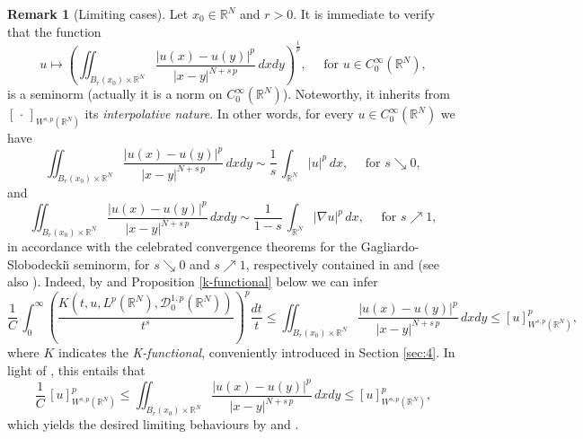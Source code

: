 \documentclass{amsart}
\theoremstyle{definition}
\newtheorem{remark}[theorem]{Remark}
\numberwithin{equation}{section}
\begin{document}
	\begin{remark} [Limiting cases] \label{rmk:seminorma-asimmetrica}
		Let $x_0 \in \mathbb{R}^N$ and $r > 0$. It is immediate to verify that the function 
		\begin{equation}\label{asym-semi}
			u \mapsto \left(\iint_{B_r(x_0) \times \mathbb{R}^N} \frac{|u(x) - u(y)|^{p}}{|x-y|^{N+s\,p}}\,dxdy\right)^{\frac{1}{p}}, \quad \mbox{ for } u \in C^\infty_0(\mathbb{R}^N),
		\end{equation}
		is a seminorm (actually it is a norm on $C^\infty_0(\mathbb{R}^N)$). Noteworthy, it inherits  from $[\,\cdot\,]_{W^{s,p}(\mathbb{R}^N)}$ its {\it interpolative nature}. In other words, for every $u \in C^\infty_0(\mathbb{R}^N)$ we have 
		\[
		\iint_{B_r(x_0) \times \mathbb{R}^N} \frac{|u(x) - u(y)|^{p}}{|x-y|^{N+s\,p}}\,dxdy \sim \frac{1}{s}\,\int_{\mathbb{R}^N} |u|^p\,dx, \quad \mbox{ for } s \searrow 0,
		\]
		and 
		\[
		\iint_{B_r(x_0) \times \mathbb{R}^N} \frac{|u(x) - u(y)|^{p}}{|x-y|^{N+s\,p}}\,dxdy \sim \frac{1}{1-s}\,\int_{\mathbb{R}^N} |\nabla u|^p\,dx, \quad \mbox{ for } s \nearrow 1, 
		\]
		in accordance with the celebrated convergence theorems for the Gagliardo-Slobodecki\u{\i} seminorm, for $s \searrow 0$ and $s \nearrow 1$, respectively contained in \cite{MazShap} and \cite{BBM} (see also \cite{Bre_constant}).  
		Indeed, by \cite[Remark 3.4]{BS} and Proposition \ref{k-functional} below we can infer 
		\[
		\frac{1}{C}\,\int_{0}^{\infty}\left(\frac{K(t,u, L^p(\mathbb{R}^N), \mathcal{D}^{1,p}_0(\mathbb{R}^N))}{t^s}\right)^p \frac{dt}{t} \le \iint_{B_r(x_0) \times \mathbb{R}^N} \frac{|u(x) - u(y)|^{p}}{|x-y|^{N+s\,p}}\,dxdy \le [u]^p_{W^{s,p}(\mathbb{R}^N)},
		\]
		where $K$ indicates the {\it K-functional}, conveniently introduced in Section \ref{sec:4}.
		In light of \cite[Proposition 4.1]{BS}, this entails that 
		\[
		\frac{1}{C}\,[u]^p_{W^{s,p}(\mathbb{R}^N)} \le \iint_{B_r(x_0) \times \mathbb{R}^N} \frac{|u(x) - u(y)|^{p}}{|x-y|^{N+s\,p}}\,dxdy \le [u]^p_{W^{s,p}(\mathbb{R}^N)},
		\]
		which yields the desired limiting behaviours by \cite[Theorem 3]{MazShap} and \cite[Proposition 2.8]{BPS}.
	\end{remark}
	
\end{document}
